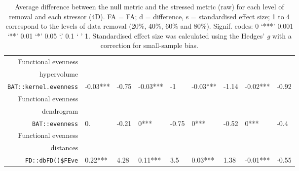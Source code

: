 \begin{table}[ht]
\begin{tabular}{rllllllll}
  Functional evenness\\ hypervolume\\ \texttt{BAT::kernel.evenness} & -0.03*** & -0.75 & -0.03*** & -1 & -0.03*** & -1.14 & -0.02*** & -0.92 \\ 
  Functional evenness\\ dendrogram\\ \texttt{BAT::evenness} & 0. & -0.21 & 0*** & -0.75 & 0*** & -0.52 & 0*** & -0.4 \\ 
  Functional evenness\\ distances\\ \texttt{FD::dbFD()\$FEve} & 0.22*** & 4.28 & 0.11*** & 3.5 & 0.03*** & 1.38 & -0.01*** & -0.55 \\ 
   \hline
\end{tabular}
\caption{Average difference between the null metric and the stressed metric (raw) for each level of removal and each stressor (4D). FA = FA; d = difference, s = standardised effect size; 1 to 4 correspond to the levels of data removal (20\%, 40\%, 60\% and 80\%). Signif. codes:  0 ‘***’ 0.001 ‘**’ 0.01 ‘*’ 0.05 ‘.’ 0.1 ‘ ’ 1. Standardised effect size was calculated using the Hedges' \textit{g} with a correction for small-sample bias.} 
\end{table}
